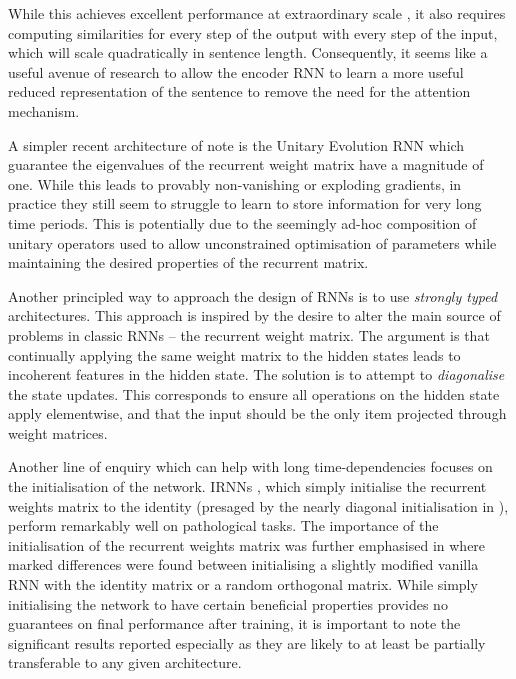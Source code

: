While this achieves excellent performance at
extraordinary scale \autocite{Wu2016a}, it also requires computing similarities for every step of the
output with every step of the input, which will scale quadratically in sentence length. Consequently,
it seems like a useful avenue of research to allow the encoder RNN to learn a more useful reduced
representation of the sentence to remove the need for the attention mechanism.

A simpler recent architecture of note is the Unitary Evolution RNN
\autocite{Arjovsky2015} which guarantee the eigenvalues of the recurrent weight matrix have a
magnitude of one. While this leads to provably non-vanishing or exploding gradients, in
practice they still seem to struggle to learn to store information for very long time periods.
This is potentially due to the seemingly ad-hoc composition of unitary operators used to allow
unconstrained optimisation of parameters while maintaining the desired properties of the
recurrent matrix.

Another principled way to approach the design of RNNs is to use \emph{strongly typed} architectures.
\autocite{Balduzzi2016} This approach is inspired by the desire to alter the main source of problems
in classic RNNs -- the recurrent weight matrix. The argument is that continually applying the same
weight matrix to the hidden states leads to incoherent features in the hidden state. The solution is
to attempt to \emph{diagonalise} the state updates. This corresponds to ensure all operations on the
hidden state apply elementwise, and that the input should be the only item projected through weight
matrices.

Another line of enquiry which can help with long time-dependencies focuses on the initialisation
of the network. IRNNs \autocite{Le2015}, which simply initialise the recurrent weights matrix to the
 identity (presaged by the nearly diagonal initialisation in \autocite{Mikolov2015}), perform
remarkably well on pathological tasks. The importance of the initialisation of the recurrent weights
matrix was further emphasised in \autocite{Henaff2016} where marked differences were found between
initialising a slightly modified vanilla RNN with the identity matrix or a random orthogonal matrix.
While simply initialising the network to have certain beneficial properties provides no guarantees
on final performance after training, it is important to note the significant results reported
especially as they are likely to at least be partially transferable to any given architecture.


